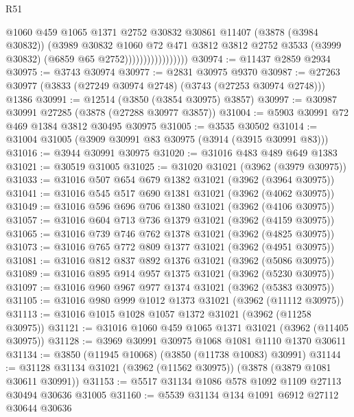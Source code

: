 \begin{lexlean}{R51}
\begin{coremodule}
                                  @1060
                                  @459
                                  @1065
                                  @1371
                                  @2752
                                  @30832
                                  @30861
                                  @11407
                                  (@3878 (@3984 @30832))
                                  (@3989
                                    @30832
                                    @1060
                                    @72
                                    @471
                                    @3812
                                    @3812
                                    @2752
                                    @3533
                                    (@3999 @30832)
                                    (@6859 @65 @2752)))))))))))))))))
@30974 := @11437 @2859 @2934
@30975 := @3743 @30974
@30977 := @2831 @30975 @9370
@30987 := @27263 @30977 (@3833 (@27249 @30974 @2748) (@3743 (@27253 @30974 @2748))) @1386
@30991 := @12514 (@3850 (@3854 @30975) @3857)
@30997 := @30987 @30991 @27285 (@3878 (@27288 @30977 @3857))
@31004 := @5903 @30991 @72 @469 @1384 @3812 @30495 @30975
@31005 := @3535 @30502
@31014 := @31004 @31005 (@3909 @30991 @83 @30975 (@3914 (@3915 @30991 @83)))
@31016 := @3944 @30991 @30975
@31020 := @31016 @483 @489 @649 @1383
@31021 := @30519 @31005
@31025 := @31020 @31021 (@3962 (@3979 @30975))
@31033 := @31016 @507 @654 @679 @1382 @31021 (@3962 (@3964 @30975))
@31041 := @31016 @545 @517 @690 @1381 @31021 (@3962 (@4062 @30975))
@31049 := @31016 @596 @696 @706 @1380 @31021 (@3962 (@4106 @30975))
@31057 := @31016 @604 @713 @736 @1379 @31021 (@3962 (@4159 @30975))
@31065 := @31016 @739 @746 @762 @1378 @31021 (@3962 (@4825 @30975))
@31073 := @31016 @765 @772 @809 @1377 @31021 (@3962 (@4951 @30975))
@31081 := @31016 @812 @837 @892 @1376 @31021 (@3962 (@5086 @30975))
@31089 := @31016 @895 @914 @957 @1375 @31021 (@3962 (@5230 @30975))
@31097 := @31016 @960 @967 @977 @1374 @31021 (@3962 (@5383 @30975))
@31105 := @31016 @980 @999 @1012 @1373 @31021 (@3962 (@11112 @30975))
@31113 := @31016 @1015 @1028 @1057 @1372 @31021 (@3962 (@11258 @30975))
@31121 := @31016 @1060 @459 @1065 @1371 @31021 (@3962 (@11405 @30975))
@31128 := @3969 @30991 @30975 @1068 @1081 @1110 @1370 @30611
@31134 := @3850 (@11945 @10068) (@3850 (@11738 @10083) @30991)
@31144 := @31128 @31134 @31021 (@3962 (@11562 @30975)) (@3878 (@3879 @1081 @30611 @30991))
@31153 := @5517 @31134 @1086 @578 @1092 @1109 @27113 @30494 @30636 @31005
@31160 := @5539 @31134 @134 @1091 @6912 @27112 @30644 @30636

\end{coremodule}
\end{lexlean}
